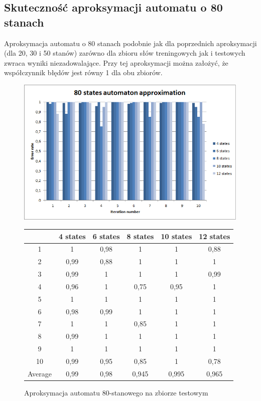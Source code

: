 \documentclass[runningheads,a4paper]{llncs}
\begin{document}
\FloatBarrier
\subsection{Skuteczność aproksymacji automatu o 80 stanach}

Aproksymacja automatu o 80 stanach podobnie jak dla poprzednich aproksymacji (dla 20, 30 i 50 stanów) zarówno dla zbioru słów treningowych jak i testowych zwraca wyniki niezadowalające. Przy tej aproksymacji można założyć, że współczynnik błędów jest równy 1 dla obu zbiorów. \\

\begin{figure}[!htb]
\includegraphics[scale=0.92]{5.png}
\endminipage\hfill
\hspace{2.2cm}
\renewcommand{\arraystretch}{1.3}%
\begin{tabular}{@{}cccccc@{}}
\toprule
        & 4 states & 6 states & 8 states & 10 states & 12 states    \\ \midrule
1       & 1        & 0,98     & 1        & 1         & 0,88 \\
2       & 0,99     & 0,88     & 1        & 1         & 1 \\
3       & 0,99     & 1        & 1        & 1         & 0,99 \\
4       & 0,96     & 1        & 0,75     & 0,95      & 1   \\
5       & 1        & 1        & 1        & 1         & 1   \\
6       & 0,98     & 0,99     & 1        & 1         & 1    \\
7       & 1        & 1        & 0,85     & 1         & 1    \\
8       & 0,99     & 1        & 1        & 1         & 1     \\
9       & 1        & 1        & 1        & 1         & 1 \\
10      & 0,99     & 0,95     & 0,85     & 1         & 0,78  \\ \bottomrule
Average & 0,99     & 0,98     & 0,945    & 0,995     & 0,965  \\ \bottomrule
\end{tabular}
\vspace{4mm}
\endminipage\hfill
\caption{Aproksymacja automatu 80-stanowego na zbiorze testowym}
\end{figure}
\end{document}
